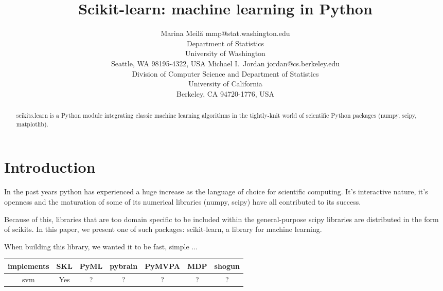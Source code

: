 \documentclass[twoside,11pt]{article}
\begin{document}
\title{Scikit-learn: machine learning in Python}


\author{\name Marina Meil\u{a} \email mmp@stat.washington.edu \\
       \addr Department of Statistics\\
       University of Washington\\
       Seattle, WA 98195-4322, USA
       \AND
       \name Michael I.\ Jordan \email jordan@cs.berkeley.edu \\
       \addr Division of Computer Science and Department of Statistics\\
       University of California\\
       Berkeley, CA 94720-1776, USA}



\maketitle

\begin{abstract}
scikits.learn is a Python module integrating classic machine learning
algorithms in the tightly-knit world of scientific Python packages
(numpy, scipy, matplotlib).
\end{abstract}




\section{Introduction}
In the past years python has experienced a huge increase as the
language of choice for scientific computing. It's interactive nature,
it's openness and the maturation of some of its numerical libraries
(numpy, scipy) have all contributed to its success.

Because of this, libraries that are too domain specific to be included
within the general-purpose scipy libraries are distributed in the form
of scikits. In this paper, we present one of such packages:
scikit-learn, a library for machine learning.

When building this library, we wanted it to be fast, simple ...



\begin{center}


\begin{tabular}{c c c c c c c}
\hline\hline %
implements & SKL & PyML & pybrain & PyMVPA &  MDP & shogun \\ [0.5ex]
\hline
svm        & Yes & ?   & ?       &  ?     & ?    & ? \\
\hline
\end{tabular}
\end{center}
\end{document}
